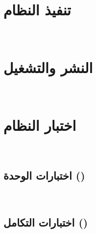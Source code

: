 \section{تنفيذ النظام}
\label{sec:implementation}
~

\section{النشر والتشغيل}
\label{sec:deployment}
~

\section{اختبار النظام}
\label{sec:testing}
~

\subsection{اختبارات الوحدة ()}
\label{subsec:unit-tests}
~

\subsection{اختبارات التكامل ()}
\label{subsec:integration-tests}
~

